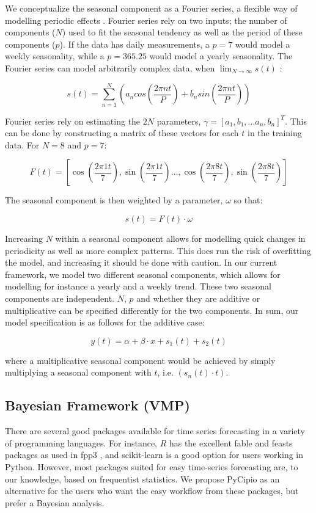 \documentclass{article}
\begin{document}
\noindent We conceptualize the seasonal component as a Fourier series, a flexible way of modelling periodic effects \cite{taylor2018forecasting}. Fourier series rely on two inputs; the number of components ($N$) used to fit the seasonal tendency as well as the period of these components ($p$). If the data has daily measurements, a $p = 7$ would model a weekly seasonality, while a $p = 365.25$ would model a yearly seasonality. The Fourier series can model arbitrarily complex data, when $\lim_{N\to\infty} s(t)$ \cite{taylor2018forecasting}:

$$s(t) = \sum _{n=1} ^N \left( a_n cos(\frac{2 \pi n t}{P}) + b_n sin(\frac{2 \pi n t}{P}) \right)$$

\noindent Fourier series rely on estimating the $2N$ parameters, $\gamma = [a_1, b_1, … a_n, b_n]^T$. This can be done by constructing a matrix of these vectors for each $t$ in the training data. For $N = 8$ and $p = 7$:

$$F(t) = \left[ \cos(\frac{2 \pi 1 t}{7}), \sin(\frac{2 \pi 1 t}{7}) \dots, \cos(\frac{2 \pi 8 t}{7}), \sin(\frac{2 \pi 8 t}{7}) \right]$$

\noindent The seasonal component is then weighted by a parameter, $\omega$ so that:

$$s(t) = F(t) \cdot \omega$$

\noindent Increasing $N$ within a seasonal component allows for modelling quick changes in periodicity as well as more complex patterns. This does run the risk of overfitting the model, and increasing it should be done with caution. In our current framework, we model two different seasonal components, which allows for modelling for instance a yearly and a weekly trend. These two seasonal components are independent. $N$, $p$ and whether they are additive or multiplicative can be specified differently for the two components. In sum, our model specification is as follows for the additive case:

$$y(t) = \alpha + \beta \cdot x + s_1(t) + s_2(t)$$

\noindent where a multiplicative seasonal component would be achieved by simply multiplying a seasonal component with $t$, i.e. $(s_n(t) \cdot t)$.


\subsection{Bayesian Framework (VMP)}

\noindent There are several good packages available for time series forecasting in a variety of programming languages. For instance, $R$ has the excellent fable and feasts packages \cite{fable_package, feasts_package} as used in fpp3 \cite{fpp3}, and scikit-learn \cite{scikit-learn} is a good option for users working in Python. However, most packages suited for easy time-series forecasting are, to our knowledge, based on frequentist statistics. We propose PyCipio as an alternative for the users who want the easy workflow from these packages, but prefer a Bayesian analysis.   
\end{document}
